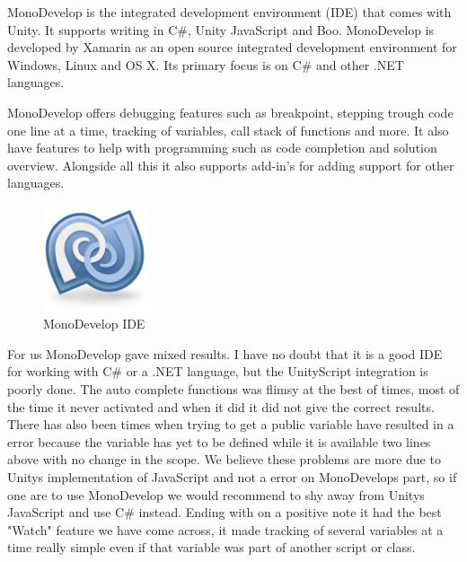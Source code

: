 MonoDevelop is the integrated development environment (IDE) that comes with Unity. It supports writing in C\#, Unity JavaScript and Boo.
MonoDevelop is developed by Xamarin \cite{xamarinRef} as an open source integrated development environment for Windows, Linux and OS X.
Its primary focus is on C\# and other .NET languages.


MonoDevelop offers debugging features such as breakpoint, stepping trough code one line at a time, tracking of variables, call stack of functions and more.
It also have features to help with programming such as code completion and solution overview. Alongside all this it also supports add-in's for adding support for other languages.


\begin{figure}
	\capstart
	\centering
	\vspace{-10pt}
	\includegraphics[width=0.28\textwidth]{images/MonoDevelopLogo.png}
	\vspace{-20pt}
	\caption[MonoDevelop IDE Logo]{{M}ono{D}evelop {IDE}}
	\label{fig:monodevelop}
	\vspace{-10px}
\end{figure}

For us MonoDevelop gave mixed results. 
I have no doubt that it is a good IDE for working with C\# or a .NET language, but the UnityScript integration is poorly done.
The auto complete functions was flimsy at the best of times, most of the time it never activated and when it did it did not give the correct results. 
There has also been times when trying to get a public variable have resulted in a error because the variable has yet to be defined while it is available two lines above with no change in the scope.
We believe these problems are more due to Unitys implementation of JavaScript and not a error on MonoDevelops part, so if one are to use MonoDevelop we would recommend to shy away from Unitys JavaScript and use C\# instead.
Ending with on a positive note it had the best "Watch" feature we have come across, it made tracking of several variables at a time really simple even if that variable was part of another script or class.	
